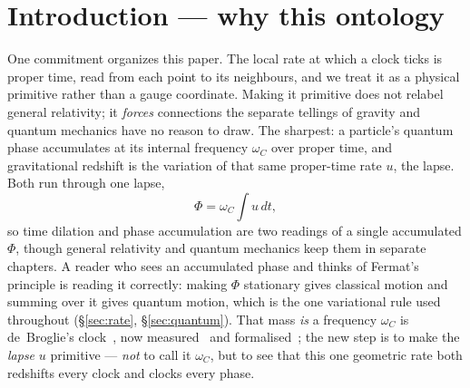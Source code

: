 \documentclass[11pt]{article}
\begin{document}
\section{Introduction --- why this ontology}\label{sec:intro}

One commitment organizes this paper. The local rate at which a clock ticks is proper time, read from each
point to its neighbours, and we treat it as a physical primitive rather than a gauge coordinate. Making it primitive does not
relabel general relativity; it \emph{forces} connections the separate tellings of gravity and quantum
mechanics have no reason to draw. The sharpest: a particle's quantum phase accumulates at its internal
frequency $\omega_C$ over proper time, and gravitational redshift is the variation of that same proper-time
rate $u$, the lapse. Both run through one lapse,
\[ \Phi=\omega_C\!\int u\,dt , \]
so time dilation and phase accumulation are two readings of a single accumulated $\Phi$, though general
relativity and quantum mechanics keep them in separate chapters. A reader who sees an accumulated phase and
thinks of Fermat's principle is reading it correctly: making $\Phi$ stationary gives classical motion and
summing over it gives quantum motion, which is the one variational rule used throughout (\S\ref{sec:rate}, \S\ref{sec:quantum}). That mass \emph{is} a frequency $\omega_C$ is de~Broglie's
clock~\cite{deBroglie1925}, now measured~\cite{Lan2013} and formalised~\cite{Dolce2011}; the new step is to make
the \emph{lapse} $u$ primitive --- \emph{not} to call it $\omega_C$, but to see that this one geometric rate
both redshifts every clock and clocks every phase.
\end{document}
